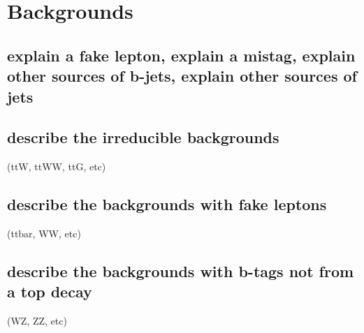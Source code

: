 	\section{Backgrounds}
		\subsection{explain a fake lepton, explain a mistag, explain other sources of b-jets, explain other sources of jets}
        		\subsection{describe the irreducible backgrounds} 
			(ttW, ttWW, ttG, etc)
        		\subsection{describe the backgrounds with fake leptons} 
			(ttbar, WW, etc)
        		\subsection{describe the backgrounds with b-tags not from a top decay} 
			(WZ, ZZ, etc)